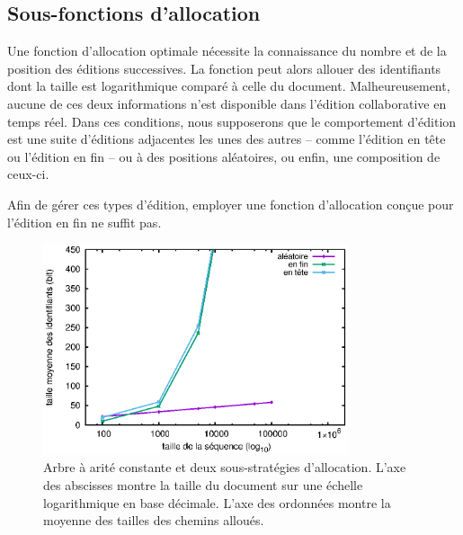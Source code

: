 

\subsection{Sous-fonctions d'allocation}
\label{repl:subsec:suballocation}

Une fonction d'allocation optimale nécessite la connaissance du nombre et de la
position des éditions successives. La fonction peut alors allouer des
identifiants dont la taille est logarithmique comparé à celle du
document. Malheureusement, aucune de ces deux informations n'est disponible dans
l'édition collaborative en temps réel. Dans ces conditions, nous supposerons que
le comportement d'édition est une suite d'éditions adjacentes les unes des
autres -- comme l'édition en tête ou l'édition en fin -- ou à des positions
aléatoires, ou enfin, une composition de ceux-ci.

Afin de gérer ces types d'édition, employer une fonction d'allocation conçue
pour l'édition en fin ne suffit pas. 

\begin{figure}
  \centering
  \includegraphics[width=0.8\textwidth]{img/lseq/robin.eps}
  \caption{\label{repl:img:suballocation} Arbre à arité constante et deux
    sous-stratégies d'allocation. L'axe des abscisses montre la taille du
    document sur une échelle logarithmique en base décimale. L'axe des ordonnées
    montre la moyenne des tailles des chemins alloués.}
\end{figure}

